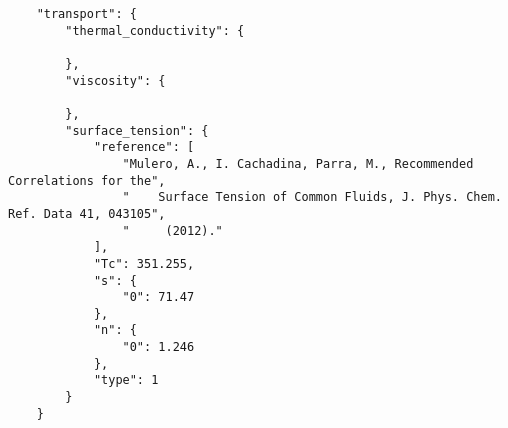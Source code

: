 \documentclass[oneside]{book}
\begin{document}
\begin{verbatim}
    "transport": {
        "thermal_conductivity": {

        },
        "viscosity": {

        },
        "surface_tension": {
            "reference": [
                "Mulero, A., I. Cachadina, Parra, M., Recommended Correlations for the",
                "    Surface Tension of Common Fluids, J. Phys. Chem. Ref. Data 41, 043105",
                "     (2012)."
            ],
            "Tc": 351.255,
            "s": {
                "0": 71.47
            },
            "n": {
                "0": 1.246
            },
            "type": 1
        }
    }
\end{verbatim}

 
\end{document}
